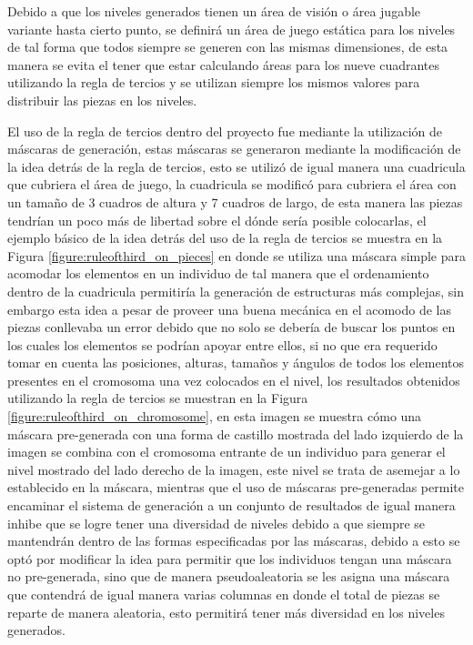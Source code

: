 Debido a que los niveles generados tienen un área de visión o área jugable
variante hasta cierto punto, se definirá un área de juego estática para los
niveles de tal forma que todos siempre se generen con las mismas dimensiones, de
esta manera se evita el tener que estar calculando áreas para los nueve
cuadrantes utilizando la regla de tercios y se utilizan siempre los mismos
valores para distribuir las piezas en los niveles.

El uso de la regla de tercios dentro
del proyecto fue mediante la utilización de máscaras de generación, estas máscaras se
generaron mediante la modificación de la idea detrás de la regla de tercios,
esto se utilizó de igual manera una cuadricula que cubriera el área de juego, la
cuadricula se modificó para cubriera el área con un tamaño de 3 cuadros de
altura y 7 cuadros de largo, de esta manera las piezas tendrían un poco más de
libertad sobre el dónde sería posible colocarlas, el ejemplo básico de la idea
detrás del uso de la regla de tercios se muestra en la Figura
\ref{figure:ruleofthird_on_pieces} en donde se utiliza una máscara simple para
acomodar los elementos en un individuo de tal manera que el ordenamiento dentro
de la cuadricula permitiría la generación de estructuras más complejas, sin
embargo esta idea a pesar de proveer una buena mecánica en el acomodo de las
piezas conllevaba un error debido que no solo se debería de buscar los puntos en
los cuales los elementos se podrían apoyar entre ellos, si no que era requerido
tomar en cuenta las posiciones, alturas, tamaños y ángulos de todos los
elementos presentes en el cromosoma una vez colocados en el nivel, los
resultados obtenidos utilizando la regla de tercios se muestran en la Figura
\ref{figure:ruleofthird_on_chromosome}, en esta imagen se muestra cómo una
máscara pre-generada con una forma de castillo mostrada del lado izquierdo de la
imagen se combina con el cromosoma entrante de un individuo para generar el
nivel mostrado del lado derecho de la imagen, este nivel se trata de asemejar a
lo establecido en la máscara, mientras que el uso de máscaras pre-generadas
permite encaminar el sistema de generación a un conjunto de resultados de igual
manera inhibe que se logre tener una diversidad de niveles debido a que siempre
se mantendrán dentro de las formas especificadas por las máscaras, debido a esto
se optó por modificar la idea para permitir que los individuos tengan una
máscara no pre-generada, sino que de manera pseudoaleatoria se les asigna una
máscara que contendrá de igual manera varias columnas en donde el total de
piezas se reparte de manera aleatoria, esto permitirá tener más diversidad en
los niveles generados.


